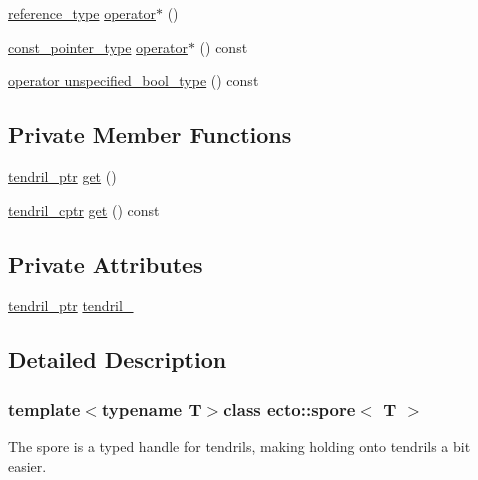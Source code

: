\begin{DoxyCompactItemize}
\item 
\hyperlink{structecto_1_1spore_a79afa6b324736afc257bc89c6c770f81}{reference\-\_\-type} \hyperlink{structecto_1_1spore_a6d693f3096c3fede0c85351d36adaded}{operator$\ast$} ()
\item 
\hyperlink{structecto_1_1spore_af1219cc7b5343824699fc7f66a5c5891}{const\-\_\-pointer\-\_\-type} \hyperlink{structecto_1_1spore_ae13ad63a891e8ed71d9010c18b754588}{operator$\ast$} () const 
\item 
\hyperlink{structecto_1_1spore_ae47aff3850e59591aed5fe2ad0b8d567}{operator unspecified\-\_\-bool\-\_\-type} () const 
\end{DoxyCompactItemize}
\subsection*{Private Member Functions}
\begin{DoxyCompactItemize}
\item 
\hyperlink{namespaceecto_a84fb5f6130275382e5cbeb5fdececa78}{tendril\-\_\-ptr} \hyperlink{structecto_1_1spore_a42f435f8c44fea74854382e0526e36ca}{get} ()
\item 
\hyperlink{namespaceecto_ad01f26ee47597f71a6f86ee34bb3ffe4}{tendril\-\_\-cptr} \hyperlink{structecto_1_1spore_a07c4091d4e5c14c30de319ec0f14b7de}{get} () const 
\end{DoxyCompactItemize}
\subsection*{Private Attributes}
\begin{DoxyCompactItemize}
\item 
\hyperlink{namespaceecto_a84fb5f6130275382e5cbeb5fdececa78}{tendril\-\_\-ptr} \hyperlink{structecto_1_1spore_a17e2ffe6861f828cad58904d20f117d4}{tendril\-\_\-}
\end{DoxyCompactItemize}


\subsection{Detailed Description}
\subsubsection*{template$<$typename T$>$class ecto\-::spore$<$ T $>$}

The spore is a typed handle for tendrils, making holding onto tendrils a bit easier. 


